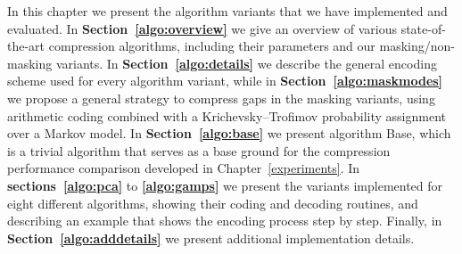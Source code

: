 


In this chapter we present the algorithm variants that we have implemented and evaluated. In \textbf{Section~\ref{algo:overview}} we give an overview of various state-of-the-art compression algorithms, including their parameters and our masking/non-masking variants. In \textbf{Section~\ref{algo:details}} we describe the general encoding scheme used for every algorithm variant, while in \textbf{Section~\ref{algo:maskmodes}} we propose a general strategy to compress gaps in the masking variants, using arithmetic coding combined with a Krichevsky–Trofimov probability assignment over a Markov model. In \textbf{Section~\ref{algo:base}} we present algorithm Base, which is a trivial algorithm that serves as a base ground for the compression performance comparison developed in Chapter~\ref{experiments}. In \textbf{sections~\ref{algo:pca}} to \textbf{\ref{algo:gamps}} we present the variants implemented for eight different algorithms, showing their coding and decoding routines, and describing an example that shows the encoding process step by step. Finally, in \textbf{Section~\ref{algo:adddetails}} we present additional implementation details. 

